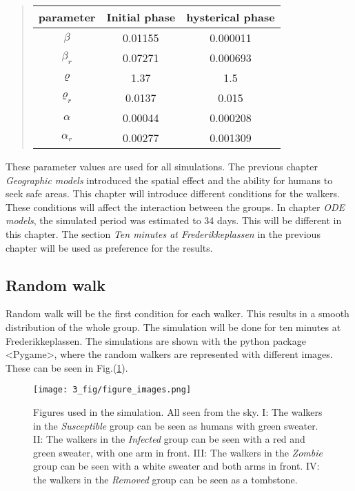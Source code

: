 \documentclass[%
twoside,                 %
final,                   %
chapterprefix=true,      %
open=right               %
10pt]{book}
\begin{document}
\label{table:param_val_random}

\begin{quote}
\begin{tabular}{ccc}
\hline
\multicolumn{1}{c}{ parameter } & \multicolumn{1}{c}{ Initial phase } & \multicolumn{1}{c}{ hysterical phase } \\
\hline
$\beta$     & 0.01155       & 0.000011         \\
$\beta_r$   & 0.07271       & 0.000693         \\
$\varrho$   & 1.37          & 1.5              \\
$\varrho_r$ & 0.0137        & 0.015            \\
$\alpha$    & 0.00044       & 0.000208         \\
$\alpha_r$  & 0.00277       & 0.001309         \\
\hline
\end{tabular}
\end{quote}

\noindent
These parameter values are used for all simulations. The previous chapter \emph{Geographic models} introduced the spatial effect and the ability for humans to seek safe areas. This chapter will introduce different conditions for the walkers. These conditions will affect the interaction between the groups. In chapter \emph{ODE models}, the simulated period was estimated to 34 days. This will be different in this chapter. The section \emph{Ten minutes at Frederikkeplassen} in the previous chapter will be used as preference for the results. 

\subsection{Random walk}
Random walk will be the first condition for each walker. This results in a smooth distribution of the whole group. The simulation will be done for ten minutes at Frederikkeplassen. The simulations are shown with the python package <Pygame>, where the random walkers are represented with different images. These can be seen in Fig.(\ref{fig:figure_images}).


\begin{figure}[ht]
  \centerline{\texttt{[image: 3\_fig/figure\_images.png]}}
  \caption{
  \label{fig:figure_images} Figures used in the simulation. All seen from the sky. I: The walkers in the \emph{Susceptible} group can be seen as humans with green sweater. II: The walkers in the \emph{Infected} group can be seen with a red and green sweater, with one arm in front. III: The walkers in the \emph{Zombie} group can be seen with a white sweater and both arms in front. IV: the walkers in the \emph{Removed} group can be seen as a tombstone.
  }
\end{figure}
\end{document}

